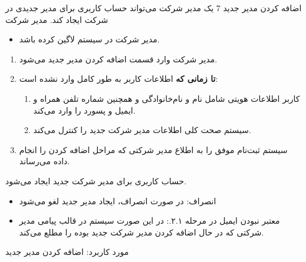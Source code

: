 \usecase
{اضافه کردن مدیر جدید}
{7}
{یک مدیر شرکت می‌تواند حساب کاربری برای مدیر جدیدی در شرکت ایجاد کند.}
{مدیر شرکت}
{}
{
	\begin{itemize}
		\item
		مدیر شرکت در سیستم لاگین کرده باشد.
		
	\end{itemize}
}
{
\begin{enumerate}
	\item 
	مدیر شرکت وارد قسمت اضافه کردن مدیر جدید می‌شود.
	
\item
\textbf{تا زمانی که} اطلاعات کاربر به طور کامل وارد نشده است:

\begin{enumerate}[label=\theenumi.\arabic*.]
	\item
	کاربر اطلاعات هویتی شامل نام و نام‌خانوادگی و همچنین شماره تلفن همراه و ایمیل و پسورد را وارد می‌کند.

	
	\item 
	سیستم صحت کلی اطلاعات مدیر شرکت جدید را کنترل می‌کند.
\end{enumerate}

	\item 
سیستم ثبت‌نام موفق را به اطلاع مدیر شرکتی که مراحل اضافه کردن را انجام داده می‌رساند.

\end{enumerate}
}
{
حساب کاربری برای مدیر شرکت جدید ایجاد می‌شود.
}
{\begin{itemize}
		\vspace*{-0.6cm}
		\item انصراف: در صورت انصراف، ایجاد مدیر جدید لغو می‌شود
		\item معتبر نبودن ایمیل در مرحله ۲.۱.: در این صورت سیستم در قالب پیامی مدیر شرکتی که در حال اضافه کردن مدیر شرکت جدید بوده را مطلع می‌کند.
		
		
\end{itemize}}
{مورد کاربرد: اضافه کردن مدیر جدید}

